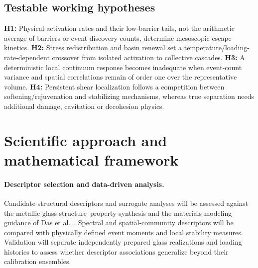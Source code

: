 \documentclass[11pt,a4paper]{article}
\begin{document}
\subsection{Testable working hypotheses}
\textbf{H1:} Physical activation rates and their low-barrier tails, not the arithmetic average of barriers or event-discovery counts, determine mesoscopic escape kinetics. \textbf{H2:} Stress redistribution and basin renewal set a temperature/loading-rate-dependent crossover from isolated activation to collective cascades. \textbf{H3:} A deterministic local continuum response becomes inadequate when event-count variance and spatial correlations remain of order one over the representative volume. \textbf{H4:} Persistent shear localization follows a competition between softening/rejuvenation and stabilizing mechanisms, whereas true separation needs additional damage, cavitation or decohesion physics.

\section{Scientific approach and mathematical framework}
\paragraph{Descriptor selection and data-driven analysis.}
Candidate structural descriptors and surrogate analyses will be assessed against the metallic-glass structure--property synthesis \cite{swayreview2025} and the materials-modeling guidance of Das et al.\ \cite{swaychapter2020}. Spectral and spatial-community descriptors \cite{swayvisual2022,swaymodularity2020} will be compared with physically defined event moments and local stability measures. Validation will separate independently prepared glass realizations and loading histories to assess whether descriptor associations generalize beyond their calibration ensembles.
\end{document}
